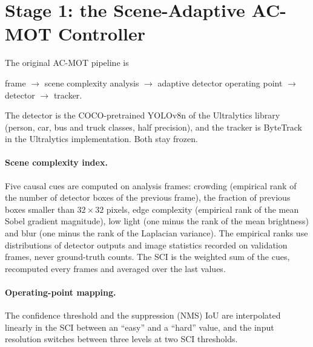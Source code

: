 \documentclass[pdflatex,sn-mathphys-num]{sn-jnl}
\begin{document}
\section{Stage 1: the Scene-Adaptive AC-MOT Controller}\label{sec:stage1}
The original AC-MOT pipeline is
\begin{center}
frame $\rightarrow$ scene complexity analysis $\rightarrow$ adaptive detector operating point $\rightarrow$ detector $\rightarrow$ tracker.
\end{center}
The detector is the COCO-pretrained YOLOv8n of the Ultralytics library~\cite{jocher2023ultralytics} (person, car, bus and truck classes, half precision), and the tracker is ByteTrack in the Ultralytics implementation. Both stay frozen.

\paragraph{Scene complexity index.} Five causal cues are computed on analysis frames: crowding (empirical rank of the number of detector boxes of the previous frame), the fraction of previous boxes smaller than $32\times 32$ pixels, edge complexity (empirical rank of the mean Sobel gradient magnitude), low light (one minus the rank of the mean brightness) and blur (one minus the rank of the Laplacian variance). The empirical ranks use distributions of detector outputs and image statistics recorded on validation frames, never ground-truth counts. The SCI is the weighted sum of the cues, recomputed every  frames and averaged over the last  values.

\paragraph{Operating-point mapping.} The confidence threshold and the suppression (NMS) IoU are interpolated linearly in the SCI between an ``easy'' and a ``hard'' value, and the input resolution switches between three levels at two SCI thresholds.
\end{document}
